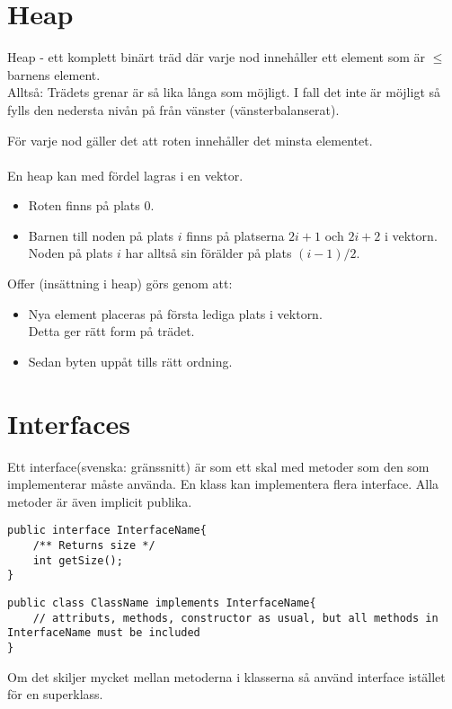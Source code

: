 \documentclass[11pt]{article}
\begin{document}
\section{Heap}
Heap - ett komplett binärt träd där varje nod innehåller ett element som är $\leq$ barnens element. \\
Alltså: Trädets grenar är så lika långa som möjligt. I fall det inte är möjligt så fylls den nedersta nivån på från vänster (vänsterbalanserat).
\begin{figure}[h]
  \begin{center}
  \end{center}
  \label{bild1}
\end{figure}
För varje nod gäller det att roten innehåller det minsta elementet. \\ \\
En heap kan med fördel lagras i en vektor. 
\begin{itemize}
\item{Roten finns på plats 0.}
\item{Barnen till noden på plats $i$ finns på platserna $2i +1$ och $2i +2$ i vektorn. Noden på plats $i$ har alltså sin förälder på plats $(i-1)/2$.}
\end{itemize}
Offer (insättning i heap) görs genom att:
\begin{itemize}
\item{Nya element placeras på första lediga plats i vektorn. \\
	Detta ger rätt form på trädet.}
\item{Sedan byten uppåt tills rätt ordning.}
\end{itemize}


\section{Interfaces}
Ett interface(svenska: gränssnitt) är som ett skal med metoder som den som implementerar måste använda. En klass kan implementera flera interface. Alla metoder är även implicit publika.  
\begin{lstlisting}
public interface InterfaceName{
	/** Returns size */
	int getSize();
}
\end{lstlisting}
\begin{lstlisting}
public class ClassName implements InterfaceName{
	// attributs, methods, constructor as usual, but all methods in InterfaceName must be included
}
\end{lstlisting}
Om det skiljer mycket mellan metoderna i klasserna så använd interface istället för en superklass.
\end{document}
